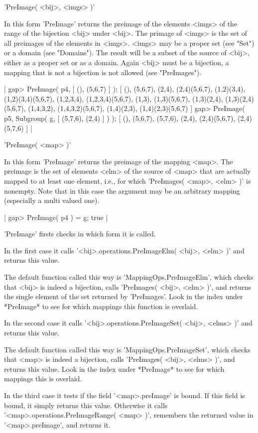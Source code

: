 'PreImage( <bij>, <imgs> )'

In  this form 'PreImage'  returns the preimage of the  elements <imgs> of
the range of the bijection <bij>  under <bij>.  The  primage of <imgs> is
the set  of all preimages  of the  elements  in <imgs>.   <imgs> may be a
proper set (see "Set") or a domain (see "Domains").  The result will be a
subset of the source  of <bij>, either  as a proper  set or  as a domain.
Again <bij> must be a bijection, a mapping that is not a bijection is not
allowed (see "PreImages").

|    gap> PreImage( p4, [ (), (5,6,7) ] );
    [ (), (5,6,7), (2,4), (2,4)(5,6,7), (1,2)(3,4), (1,2)(3,4)(5,6,7), 
      (1,2,3,4), (1,2,3,4)(5,6,7), (1,3), (1,3)(5,6,7), (1,3)(2,4), 
      (1,3)(2,4)(5,6,7), (1,4,3,2), (1,4,3,2)(5,6,7), (1,4)(2,3), 
      (1,4)(2,3)(5,6,7) ]
    gap> PreImage( p5, Subgroup( g, [ (5,7,6), (2,4) ] ) );
    [ (), (5,6,7), (5,7,6), (2,4), (2,4)(5,6,7), (2,4)(5,7,6) ] |

'PreImage( <map> )'

In this form 'PreImage' returns the preimage of  the  mapping <map>.  The
preimage is  the set of  elements <elm>  of the source of <map> that  are
actually  mapped  to at least  one element,  i.e.,  for which 'PreImages(
<map>, <elm> )' is nonempty.  Note that in this case the  argument may be
an arbitrary mapping (especially a multi valued one).

|    gap> PreImage( p4 ) = g;
    true |

'PreImage' firsts checks in which form it is called.

In the first case it calls '<bij>.operations.PreImageElm( <bij>, <elm> )'
and returns this value.

The default function called this  way  is 'MappingOps.PreImageElm', which
checks that <bij> is indeed a  bijection, calls 'PreImages(  <bij>, <elm>
)', and returns the single element of the  set returned  by  'PreImages'.
Look in  the  index  under  *PreImage* to see  for  which  mappings  this
function is overlaid.

In the second case  it calls '<bij>.operations.PreImageSet( <bij>, <elms>
)' and returns this value.

The default  function called  this way is 'MappingOps.PreImageSet', which
checks that <map> is indeed a bijection,  calls 'PreImages( <bij>, <elms>
)',  and  returns  this value.  Look in the index under *PreImage* to see
for which mappings this is overlaid.

In the third case it tests  if the field  '<map>.preImage' is bound.   If
this field is bound,  it simply returns  this  value.  Otherwise it calls
'<map>.operations.PreImageRange( <map> )',  remembers  the returned value
in '<map>.preImage', and returns it.

